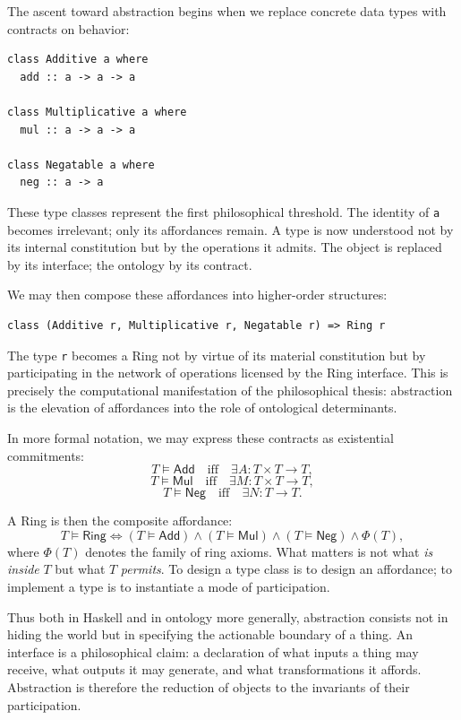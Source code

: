\documentclass[11pt,letterpaper]{article}
\begin{document}
The ascent toward abstraction begins when we replace concrete data types with contracts on behavior:
\begin{verbatim}
class Additive a where
  add :: a -> a -> a

class Multiplicative a where
  mul :: a -> a -> a

class Negatable a where
  neg :: a -> a
\end{verbatim}

These type classes represent the first philosophical threshold. The identity of \texttt{a} becomes irrelevant; only its affordances remain. A type is now understood not by its internal constitution but by the operations it admits. The object is replaced by its interface; the ontology by its contract.

We may then compose these affordances into higher-order structures:
\begin{verbatim}
class (Additive r, Multiplicative r, Negatable r) => Ring r
\end{verbatim}

The type \texttt{r} becomes a Ring not by virtue of its material constitution but by participating in the network of operations licensed by the Ring interface. This is precisely the computational manifestation of the philosophical thesis: abstraction is the elevation of affordances into the role of ontological determinants.

In more formal notation, we may express these contracts as existential commitments:
\[
T \vDash \mathsf{Add} \quad \text{iff} \quad \exists A: T \times T \to T,
\]
\[
T \vDash \mathsf{Mul} \quad \text{iff} \quad \exists M: T \times T \to T,
\]
\[
T \vDash \mathsf{Neg} \quad \text{iff} \quad \exists N: T \to T.
\]

A Ring is then the composite affordance:
\[
T \vDash \mathsf{Ring} \iff 
   (T \vDash \mathsf{Add}) 
\land (T \vDash \mathsf{Mul}) 
\land (T \vDash \mathsf{Neg})
\land \Phi(T),
\]
where \(\Phi(T)\) denotes the family of ring axioms. What matters is not what \emph{is inside} \(T\) but what \(T\) \emph{permits}. To design a type class is to design an affordance; to implement a type is to instantiate a mode of participation.

Thus both in Haskell and in ontology more generally, abstraction consists not in hiding the world but in specifying the actionable boundary of a thing. An interface is a philosophical claim: a declaration of what inputs a thing may receive, what outputs it may generate, and what transformations it affords. Abstraction is therefore the reduction of objects to the invariants of their participation.
\end{document}
